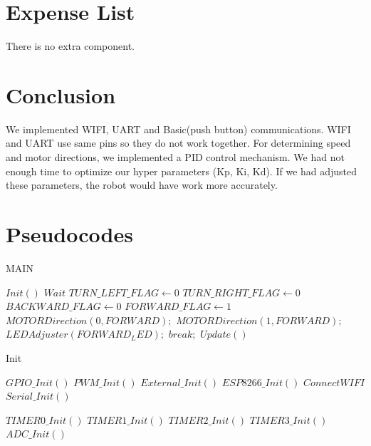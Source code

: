 \documentclass[12pt]{article}
\begin{document}
\section{Expense List}
There is no extra component.

\section{Conclusion}
We implemented WIFI, UART and Basic(push button) communications. WIFI and UART use same pins so they do not work together. For determining speed and motor directions, we implemented a PID control mechanism. We had not enough time to optimize our hyper parameters (Kp, Ki, Kd). If we had adjusted these parameters, the robot would have work more accurately.

\newpage
\newpage

\section{Pseudocodes}


\begin{algorithm}
\caption{MAIN}\label{euclid}
\begin{algorithmic}[1]
\Comment{}
\State $Init()$
\State $Wait$
		\State $TURN\_LEFT\_FLAG \gets 0$
		\State $TURN\_RIGHT\_FLAG \gets 0$
		\State $BACKWARD\_FLAG \gets 0$
		\State $FORWARD\_FLAG \gets 1$
		\State $MOTORDirection(0, FORWARD);$
		\State $MOTORDirection(1, FORWARD);$
		\State $LEDAdjuster(FORWARD_LED);$
	\EndIf
	\State $break;$
\EndIf
\EndWhile
{} 
    \State $Update()$
\EndIf
\EndProcedure
\end{algorithmic}
\end{algorithm}

\begin{algorithm}
\caption{Init}\label{euclid}
\begin{algorithmic}[1]
\Comment{}
    \State $GPIO\_Init()$
    \State $PWM\_Init()$
    \State $External\_Init()$
        \State $ESP8266\_Init()$
        \State $Connect WIFI$
    \Else
        \State $Serial\_Init()$
    \EndIf
    \EndIf
    
    \State $TIMER0\_Init()$
    \State $TIMER1\_Init()$
    \State $TIMER2\_Init()$
    \State $TIMER3\_Init()$
    \State $ADC\_Init()$
\EndProcedure
\end{algorithmic}
\end{algorithm}
\end{document}
